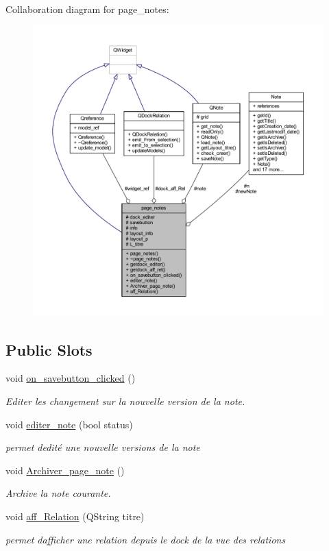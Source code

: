 Collaboration diagram for page\+\_\+notes\+:\nopagebreak
\begin{figure}[H]
\begin{center}
\leavevmode
\includegraphics[width=350pt]{classpage__notes__coll__graph}
\end{center}
\end{figure}
\subsection*{Public Slots}
\begin{DoxyCompactItemize}
\item 
void \hyperlink{classpage__notes_a3810696feb56abdad663cb7ae4b2f1b0}{on\+\_\+savebutton\+\_\+clicked} ()
\begin{DoxyCompactList}\small\item\em Editer les changement sur la nouvelle version de la note. \end{DoxyCompactList}\item 
void \hyperlink{classpage__notes_a9fd367fb577c6048353f18ad56792c1f}{editer\+\_\+note} (bool status)
\begin{DoxyCompactList}\small\item\em permet d\textquotesingle{}edité une nouvelle versions de la note \end{DoxyCompactList}\item 
void \hyperlink{classpage__notes_a8d23f8f379d4aa402193f589ac3e4afa}{Archiver\+\_\+page\+\_\+note} ()
\begin{DoxyCompactList}\small\item\em Archive la note courante. \end{DoxyCompactList}\item 
void \hyperlink{classpage__notes_a5c00719607b3e0f3a78c3b35b6df4df9}{aff\+\_\+\+Relation} (Q\+String titre)
\begin{DoxyCompactList}\small\item\em permet d\textquotesingle{}afficher une relation depuis le dock de la vue des relations \end{DoxyCompactList}\end{DoxyCompactItemize}
